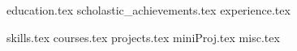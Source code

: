 \documentclass[11pt, a4paper]{awesome-cv}
\newcommand*{\sectiondir}{resume/}
\begin{document}
\makecvheader

{education.tex}
{scholastic_achievements.tex}
{experience.tex}

{skills.tex}
{courses.tex}
{projects.tex}
{miniProj.tex}
{misc.tex}
\end{document}
